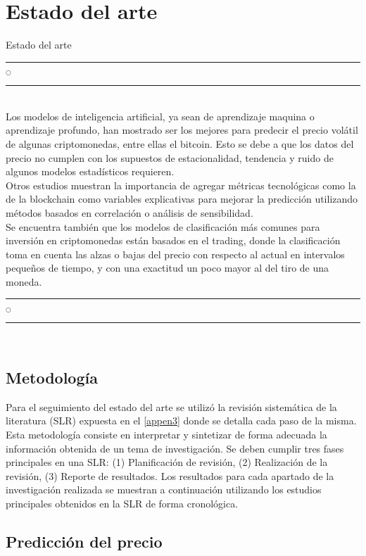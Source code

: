 \chapter[Estado del arte]{Estado del arte}{Estado del arte}\label{estado_arte}
\renewcommand{\tablename}{Tabla}

\noindent
\rule{0.49\textwidth}{0.75pt} $_{\bigcirc}$ \rule{0.49\textwidth}{0.75pt}\\

Los modelos de inteligencia artificial, ya sean de aprendizaje maquina o aprendizaje profundo, han mostrado ser los mejores para predecir el precio volátil de algunas criptomonedas, entre ellas el bitcoin. Esto se debe a que los datos del precio no cumplen con los supuestos de estacionalidad, tendencia y ruido de algunos modelos estadísticos requieren.\\
Otros estudios muestran la importancia de agregar métricas tecnológicas como la de la blockchain como variables explicativas para mejorar la predicción utilizando métodos basados en correlación o análisis de sensibilidad.\\
Se encuentra también que los modelos de clasificación más comunes para inversión en criptomonedas están basados en el trading, donde la clasificación toma en cuenta las alzas o bajas del precio con respecto al actual en intervalos pequeños de tiempo, y con una exactitud un poco mayor al del tiro de una moneda.\\

\noindent
\rule{0.49\textwidth}{0.75pt} $_{\bigcirc}$ \rule{0.49\textwidth}{0.75pt}\\
\clearpage

\section{Metodología} 

Para el seguimiento del estado del arte se utilizó la revisión sistemática de la literatura (SLR) expuesta en el \autoref{appen3} donde se detalla cada paso de la misma. Esta metodología consiste en interpretar y sintetizar de forma adecuada la información obtenida de un tema de investigación. Se deben cumplir tres fases principales en una SLR: (1) Planificación de revisión, (2) Realización de la revisión, (3) Reporte de resultados. Los resultados para cada apartado de la investigación realizada se muestran a continuación utilizando los estudios principales obtenidos en la SLR de forma cronológica.

\section{Predicción del precio}

